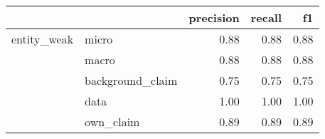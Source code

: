 \begin{tabular}{llrrr}
\toprule
            &           &  precision &  recall &   f1 \\
\midrule
entity\_weak & micro &       0.88 &    0.88 & 0.88 \\
            & macro &       0.88 &    0.88 & 0.88 \\
            & background\_claim &       0.75 &    0.75 & 0.75 \\
            & data &       1.00 &    1.00 & 1.00 \\
            & own\_claim &       0.89 &    0.89 & 0.89 \\
\bottomrule
\end{tabular}
